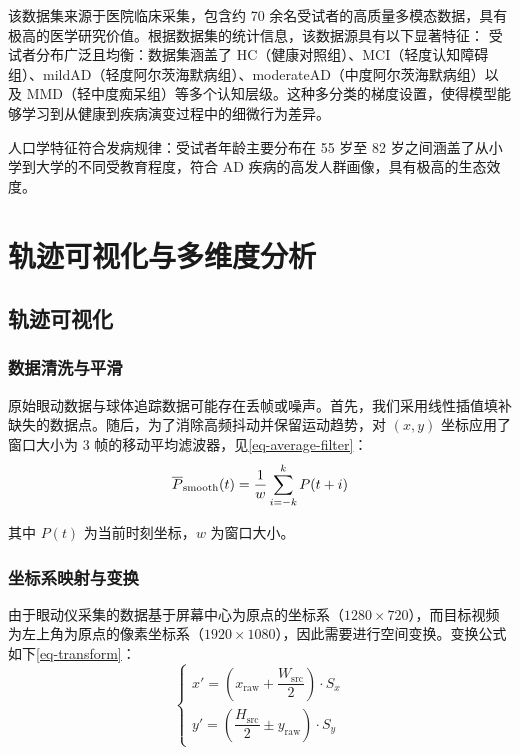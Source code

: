 \documentclass[12pt,hyperref,a4paper,UTF8]{ctexart}
\newcommand{\barline}[1]{\overline{#1\rule{0pt}{1.5ex}}}
\begin{document}
该数据集来源于医院临床采集，包含约 70 余名受试者的高质量多模态数据，具有极高的医学研究价值。根据数据集的统计信息，该数据源具有以下显著特征：
受试者分布广泛且均衡：数据集涵盖了 HC（健康对照组）、MCI（轻度认知障碍组）、mildAD（轻度阿尔茨海默病组）、moderateAD（中度阿尔茨海默病组）以及 MMD（轻中度痴呆组）等多个认知层级。这种多分类的梯度设置，使得模型能够学习到从健康到疾病演变过程中的细微行为差异。

人口学特征符合发病规律：受试者年龄主要分布在 55 岁至 82 岁之间涵盖了从小学到大学的不同受教育程度，符合 AD 疾病的高发人群画像，具有极高的生态效度。



\section{轨迹可视化与多维度分析}
\subsection{轨迹可视化}
\subsubsection{数据清洗与平滑}
原始眼动数据与球体追踪数据可能存在丢帧或噪声。首先，我们采用线性插值填补缺失的数据点。随后，为了消除高频抖动并保留运动趋势，对 $(x, y)$ 坐标应用了窗口大小为 3 帧的移动平均滤波器，见\autoref{eq-average-filter}：
\begin{equation}
    \barline{P}_{\text{smooth}}(t)=\dfrac{1}{w}\sum_{i=-k}^{k}P(t+i) \label{eq-average-filter}
\end{equation}

其中 $P(t)$ 为当前时刻坐标，$w$ 为窗口大小。



\subsubsection{坐标系映射与变换}
由于眼动仪采集的数据基于屏幕中心为原点的坐标系（$1280\times720$），而目标视频为左上角为原点的像素坐标系（$1920\times1080$），因此需要进行空间变换。变换公式如下\autoref{eq-transform}：
\begin{equation}
    \begin{cases}
        x'=\left(x_{\text{raw}}+\dfrac{W_{\text{src}}}{2}\right)\cdot S_{x}
        \\[10pt]
        y'=\left(\dfrac{H_{\text{src}}}{2}\pm y_{\text{raw}}\right)\cdot S_{y}
    \end{cases} \label{eq-transform}
\end{equation}
\end{document}
